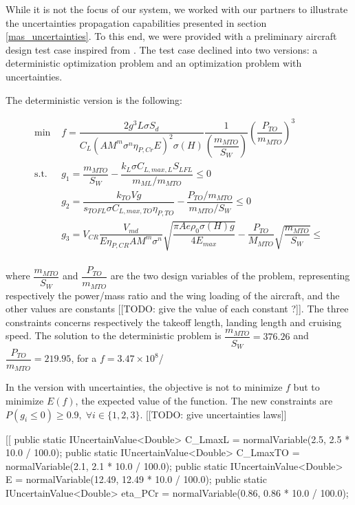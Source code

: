 While it is not the focus of our system, we worked with our partners to illustrate the uncertainties propagation capabilities presented in section \ref{mas_uncertainties}. To this end, we were provided with a preliminary aircraft design test case inspired from \cite{scholz2008preliminary}. The test case declined into two versions: a deterministic optimization problem and an optimization problem with uncertainties.

The deterministic version is the following:

\begin{align*}
	\text{min }& f = \dfrac{2 g^3 L \sigma S_d}{C_L (A M^m {\sigma}^n \eta_{P,Cr} E)^2 \sigma (H)} \dfrac{1}{ \left( \dfrac{m_{MTO}}{S_W} \right) } \left(\dfrac{P_{TO}}{m_{MTO}}\right)^3  \\
	\text{s.t. } & g_1 = \dfrac{m_{MTO}}{S_W} - \dfrac{k_L \sigma C_{L, max, L} S_{LFL}}{ m_{ML}/m_{MTO}}\leq 0 \\
						&	g_2 = \dfrac{k_{TO} V g }{s_{TOFL} \sigma C_{L, max, TO} \eta_{P, TO}} - \dfrac{P_{TO}/m_{MTO}}{m_{MTO}/S_W} \leq 0\\
						&	g_3 = V_{CR}\dfrac{V_{md}}{E \eta_{P, CR} A M^m {\sigma}^n} \sqrt{\dfrac{\pi A e {\rho}_0 \sigma(H)g}{4 E_{max}}} - \dfrac{P_{TO}}{M_{MTO}} \sqrt{\dfrac{m_{MTO}}{S_W}} \leq \\
\end{align*}

where $\dfrac{m_{MTO}}{S_W}$ and $\dfrac{P_{TO}}{m_{MTO}}$ are the two design variables of the problem, representing respectively the power/mass ratio and the wing loading of the aircraft, and the other values are constants [[TODO: give the value of each constant ?]]. The three constraints concerns respectively the takeoff length, landing length and cruising speed. The solution to the deterministic problem is $\dfrac{m_{MTO}}{S_W} = 376.26$ and $\dfrac{P_{TO}}{m_{MTO}} = 219.95$, for a $f = 3.47 \times{} 10^8$/

In the version with uncertainties, the objective is not to minimize $f$ but to minimize $E(f)$, the expected value of the function. The new constraints are $P(g_i \leq 0) \geq 0.9, \; \forall i \in \{1, 2, 3\}$. [[TODO: give uncertainties laws]]

[[
	public static IUncertainValue<Double> C_LmaxL = normalVariable(2.5, 2.5 * 10.0 / 100.0);
	public static IUncertainValue<Double> C_LmaxTO = normalVariable(2.1, 2.1 * 10.0 / 100.0);
	public static IUncertainValue<Double> E = normalVariable(12.49, 12.49 * 10.0 / 100.0);
	public static IUncertainValue<Double> eta_PCr = normalVariable(0.86, 0.86 * 10.0 / 100.0);

